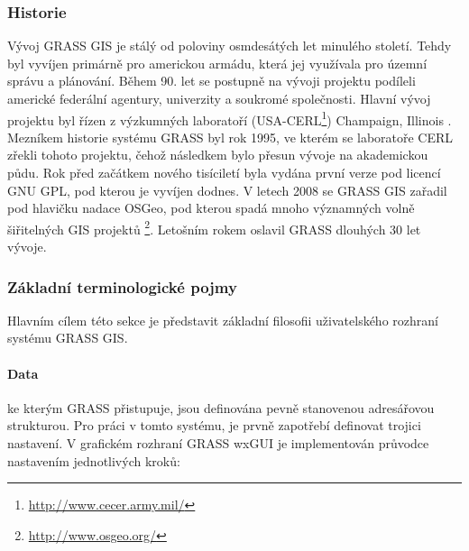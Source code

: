\documentclass[a4paper,12pt,oneside]{report}
\begin{document}
\subsubsection*{Historie}
Vývoj GRASS GIS je stálý od poloviny osmdesátých let minulého
století. Tehdy byl vyvíjen primárně pro americkou armádu, která jej
využívala pro územní správu a plánování. Během 90. let se postupně na
vývoji projektu podíleli americké federální agentury, univerzity a
soukromé společnosti. Hlavní vývoj projektu byl řízen z výzkumných
laboratoří (USA-CERL\footnote{\url{http://www.cecer.army.mil/}})
Champaign, Illinois \cite{grasshist}.  Mezníkem historie systému GRASS byl
rok 1995, ve kterém se laboratoře CERL zřekli tohoto projektu, čehož
následkem bylo přesun vývoje na akademickou půdu. Rok před začátkem
nového tisíciletí byla vydána první verze pod licencí GNU GPL, pod
kterou je vyvíjen dodnes. V letech 2008 se GRASS GIS zařadil pod hlavičku nadace
   \acs{OSGeo}, pod kterou spadá mnoho významných volně šiřitelných
GIS
projektů \footnote{\url{http://www.osgeo.org/}}. Letošním rokem
oslavil GRASS dlouhých 30 let vývoje.

\subsubsection*{Základní terminologické pojmy}
\label{subsubsec:grassterminologie}
Hlavním cílem této sekce je představit základní filosofii
uživatelského rozhraní systému GRASS GIS.
\paragraph*{Data} ke kterým GRASS přistupuje, jsou definována pevně
stanovenou adresářovou strukturou. Pro práci v tomto systému, je prvně
zapotřebí definovat trojici nastavení. V grafickém rozhraní GRASS
   \acs{wxGUI} je implementován průvodce nastavením jednotlivých kroků:
\end{document}
